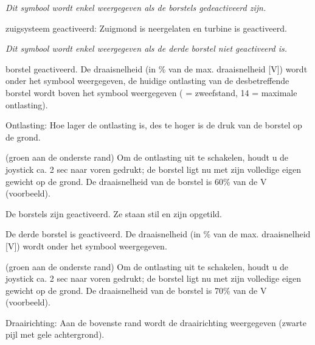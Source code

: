 {\em Dit symbool wordt enkel weergegeven als de borstels gedeactiveerd zijn.}

\startSymVpad
{}
\SymVpad
{} zuigsysteem geactiveerd:
Zuigmond is neergelaten en turbine is geactiveerd.
\stopSymVpad



{\em Dit symbool wordt enkel weergegeven als de derde borstel niet geactiveerd is.}

\startSymVpad
{}
\SymVpad
{} borstel geactiveerd. De draaisnelheid (in \% van de max. draaisnelheid [V]) wordt onder het symbool weergegeven, de huidige ontlasting van de desbetreffende borstel wordt boven het symbool weergegeven (\type{ } = zweefstand, 14 = maximale ontlasting).

{\md Ontlasting:} {\lt Hoe lager de ontlasting is, des te hoger is de druk van de borstel op de grond.}
\stopSymVpad


\startSymVpad
{}
\SymVpad
{}(groen aan de onderste rand)
Om de ontlasting uit te schakelen, houdt u de joystick ca. 2 sec naar voren gedrukt; de borstel ligt nu met zijn volledige eigen gewicht op de grond. De draaisnelheid van de borstel is 60\hairspace\% van de V (voorbeeld).
\stopSymVpad

\startSymVpad
{}
\SymVpad
{} De borstels zijn geactiveerd. Ze staan stil en zijn opgetild.
\stopSymVpad



\startSymVpad
{}
\SymVpad
{} De derde borstel  is geactiveerd. De draaisnelheid (in \% van de max. draaisnelheid [V]) wordt onder het symbool weergegeven.
\stopSymVpad


\startSymVpad
{}
\SymVpad
{}(groen aan de onderste rand)
Om de ontlasting uit te schakelen, houdt u de joystick ca. 2 sec naar voren gedrukt; de borstel ligt nu met zijn volledige eigen gewicht op de grond. De draaisnelheid van de borstel is 70\hairspace\% van de V (voorbeeld).

{\md Draairichting:} {\lt Aan de bovenste rand wordt de draairichting weergegeven (zwarte pijl met gele achtergrond).}
\stopSymVpad

